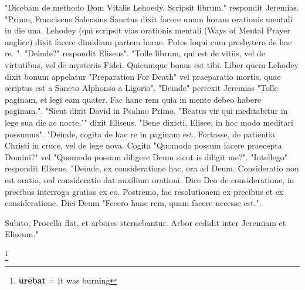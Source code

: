 "Dicebam de methodo Dom Vitalis Lehoedy. Scripsit librum." respondit Jeremias. "Primo, Franciscus Salensius Sanctus dixit facere unam horam orationis mentali in die una. Lehodey (qui scripsit vias orationis mentali (Ways of Mental Prayer anglice) dixit facere dimidiam partem horae. Potes loqui cum presbytero de hac re. ". "Deinde?" respondit Eliseus". "Tolle librum, qui est de vitiis, vel de virtutibus, vel de mysteriis Fidei. Quicumque bonus est tibi. Liber quem Lehodey dixit bonum appelatur "Preparation For Death" vel praeparatio mortis, quae scriptus est a Sancto Alphonso a Ligorio". "Deinde" perrexit Jeremias "Tolle paginam, et legi eam quater. Fac hanc rem quia in mente debeo habere paginam.". "Sicut dixit David in Psalmo Primo, "Beatus vir qui meditabitur in lege sua die ac nocte."" dixit Eliseus. "Bene dixisti, Elisee, in hoc modo meditari possumus". "Deinde, cogita de hac re in paginam est. Fortasse, de patientia Christi in cruce, vel de lege nova. Cogita "Quomodo possum facere praecepta Domini?" vel "Quomodo possum diligere Deum sicut is diligit me?". "Intellego" respondit Eliseus. "Deinde, ex consideratione hac, ora ad Deum. Consideratio non est oratio, sed consideratio dat auxilium orationi. Dice Deo de consideratione, in precibus interroga gratias ex eo. Postremo, fac resolutionem ex precibus et ex consideratione. Dici Deum "Fecero hanc rem, quam facere necesse est.". 

Subito, Procella flat, et arbores sternebantur. Arbor cedidit inter Jeremiam et Eliseum." 

   

\footnote{\textbf{ūrēbat} = It was burning}